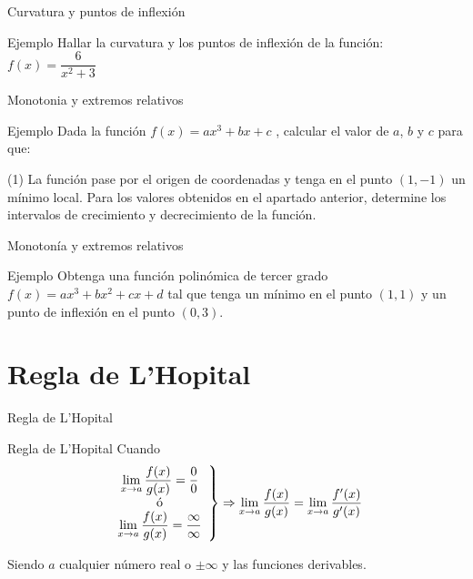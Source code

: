 \documentclass[8pt]{beamer}
\begin{document}
\begin{frame}[t]{Curvatura y puntos de inflexión}
\begin{exampleblock}{Ejemplo}
Hallar la curvatura y los puntos de inflexión de la función: $f(x)=\dfrac{6}{x^2+3}$
\end{exampleblock}
\end{frame}

\begin{frame}[t]{Monotonia y extremos relativos}
\begin{exampleblock}{Ejemplo}
Dada la función $f(x)=ax^3+bx+c$ , calcular el valor de $a$, $b$ y $c$ para
que:
\begin{tasks}[label=\alph*)](1)
\task La función pase por el origen de coordenadas y tenga en el punto $(1,-1)$ un mínimo local.
\task Para los valores obtenidos en el apartado anterior, determine los intervalos de crecimiento y decrecimiento de la función.
\end{tasks}
\end{exampleblock}
\end{frame}

\begin{frame}[t]{Monotonía y extremos relativos}
\begin{exampleblock}{Ejemplo}
Obtenga una función polinómica de tercer grado $f(x) = ax^3 + bx^2 + cx + d$ tal que tenga un mínimo en el punto $(1,1)$ y un punto de inflexión en el punto $(0,3)$.
\end{exampleblock}
\end{frame}


\section{Regla de L'Hopital}

\begin{frame}[t]{Regla de L'Hopital}
\begin{alertblock}{Regla de L'Hopital}
Cuando
	\[\left. \begin{array}{c} \displaystyle \lim_{x \rightarrow a}{\dfrac{f(x)}{g(x)}}=\dfrac{0}{0}  \\ \text{ó}  \\ \displaystyle \lim_{x \rightarrow a}{\dfrac{f(x)}{g(x)}}=\dfrac{\infty}{\infty} \end{array} \right\rbrace \Rightarrow  \lim_{x \to a}\dfrac{f(x)}{g(x)}=\lim_{x \to a}\dfrac{f'(x)}{g'(x)}	\]
	
	Siendo $a$ cualquier número real o $\pm\infty$ y las funciones derivables.
\end{alertblock}
\end{frame}
\end{document}
